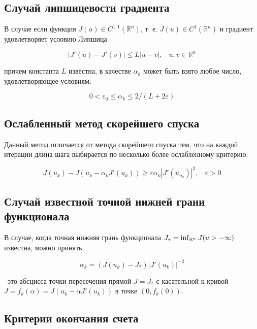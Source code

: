\documentclass[a4paper, 12pt, titlepage]{article}
\theoremstyle{definition}
\theoremstyle{plain}
\theoremstyle{plain}
\begin{document}
\subsection{Случай липшицевости градиента}

В случае если функция $J(u) \in C^{1, 1}(\mathbb{R}^{n})$, т. е.
$J(u) \in C^{1}(\mathbb{R}^{n})$ и градиент удовлетворяет условию Липшица

\begin{equation}
 |J'(u) - J'(v)| \leq L |u - v|, \;\;\; u, v \in \mathbb{R}^{n}
\end{equation}

причем константа $L$ известна, в качестве $\alpha_{k}$ может быть взято любое
число, удовлетворяющее условиям:

\begin{equation}
 0 < \varepsilon_{0} \leq \alpha_{k} \leq 2 / (L + 2 \varepsilon)
\end{equation}

\subsection{Ослабленный метод скорейшего спуска}

Данный метод отличается от метода скорейшего спуска тем, что на каждой итерации
длина шага выбирается по несколько более ослабленному критерию:

\begin{equation}
 J(u_{k}) - J(u_{k} - \alpha_{k} J'(u_{k})) \geq
 \varepsilon \alpha_{k} |J'(u_{u_{k}})|^{2}, \;\;\; \varepsilon > 0
\end{equation}


\subsection{Случай известной точной нижней грани функционала}

В случае, когда точная нижняя грань функционала
$J_{*} = \operatornamewithlimits{inf}_{\mathbb{R}^{n}} J(u > -\infty)$ известна,
можно принять

\begin{equation}
 \alpha_{k} = (J(u_{k}) - J_{*}) |J'(u_{k})|^{-2}
\end{equation}

--это абсцисса точки пересечения прямой $J = J_{*}$ с касательной к кривой
$J = f_{k}(\alpha) = J(u_{k} - \alpha J'(u_{k}))$ в точке $(0, f_{k}(0))$.

\subsection{Критерии окончания счета}
\end{document}
